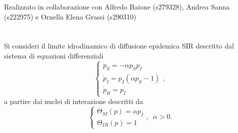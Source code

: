 \documentclass[11pt,largemargins]{homework}
\begin{document}
\maketitle
\begin{center}
Realizzato in collaborazione con Alfredo Baione (s279328), Andrea Sanna (s222975) e Ornella Elena Grassi (s290310)
\end{center}
\section{}%
Si consideri il limite idrodinamico di diffusione epidemica SIR descritto dal sistema di equazioni differenziali
\begin{equation*}
\begin {cases} \dot{p}_{S}=-\alpha p_{S}p_{I}\\\dot{p}_{I}=p_{I}\left(\alpha p_{S}-1\right)\\\dot{p}_{R}=p_{I}\end{cases},
\end{equation*}
a partire dai nuclei di interazione descritti da
\begin{equation*}
\begin {cases} \Theta_{SI}\left(p\right)=\alpha p_{I}\\\Theta_{IR}\left(p\right)=1\end{cases}, \,\,\,\alpha>0.
\end{equation*}
\end{document}
